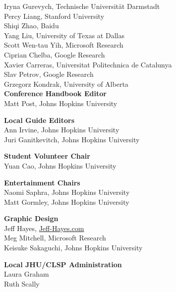 Iryna Gurevych, Technische Universität Darmstadt  \\
Percy Liang, Stanford University  \\
Shiqi Zhao, Baidu  \\
Yang Liu, University of Texas at Dallas  \\
Scott Wen-tau Yih, Microsoft Research  \\
Ciprian Chelba, Google Research  \\
Xavier Carreras, Universitat Politechnica de Catalunya  \\
Slav Petrov, Google Research  \\
Grzegorz Kondrak, University of Alberta  \\

{\bf Conference Handbook Editor} \\
Matt Post, Johns Hopkins University \\

{\bf Local Guide Editors} \\
Ann Irvine, Johns Hopkins University \\
Juri Ganitkevitch, Johns Hopkins University \\

{\bf Student Volunteer Chair} \\
Yuan Cao, Johns Hopkins University \\

{\bf Entertainment Chairs} \\
Naomi Saphra, Johns Hopkins University\\
Matt Gormley, Johns Hopkins University\\

{\bf Graphic Design} \\
Jeff Hayes, \url{Jeff-Hayes.com}\\
Meg Mitchell, Microsoft Research\\
Keisuke Sakaguchi, Johns Hopkins University\\

{\bf Local JHU/CLSP Administration} \\
Laura Graham\\
Ruth Scally\\
